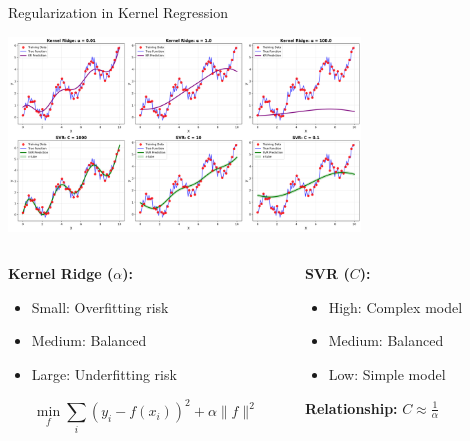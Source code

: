 \documentclass[8pt,aspectratio=1610]{beamer}
\begin{document}
\begin{frame}{Regularization in Kernel Regression}
\begin{center}
\includegraphics[width=0.7\textwidth]{../figures/regularization_comparison.png}
\end{center}

\begin{columns}[t]
\begin{column}{0.48\textwidth}
\textbf{Kernel Ridge ($\alpha$):}
\begin{itemize}
\setlength{\itemsep}{0pt}
\item Small: Overfitting risk
\item Medium: Balanced
\item Large: Underfitting risk
\end{itemize}

$$\min_f \sum_{i} (y_i - f(x_i))^2 + \alpha \|f\|^2$$
\end{column}

\begin{column}{0.48\textwidth}
\textbf{SVR ($C$):}
\begin{itemize}
\setlength{\itemsep}{0pt}
\item High: Complex model
\item Medium: Balanced
\item Low: Simple model
\end{itemize}

\textbf{Relationship:} $C \approx \frac{1}{\alpha}$
\end{column}
\end{columns}
\end{frame}
\end{document}
